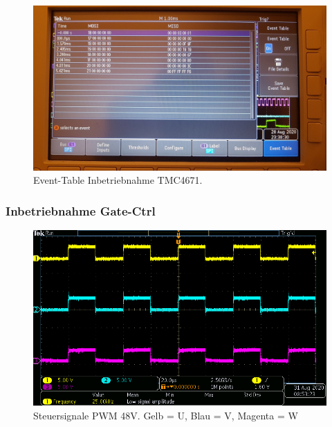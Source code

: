 \begin{appendix}
\begin{figure}[h!]
\center
\includegraphics[width = \textwidth]{graphics/TMC4671_TimeTable_Lesen_Bild}
\caption{Event-Table Inbetriebnahme TMC4671.}
\label{fig:TMC4671_TimeTable_Lesen_Bild}
\end{figure}

\newpage

\subsubsection{Inbetriebnahme Gate-Ctrl}\label{Appendix:TMC4671_Gate_Ctrl}

\begin{figure}[h!]
\center
\includegraphics[width = \textwidth]{graphics/TMC4671_Gate_Signal_H}
\caption{Steuersignale PWM 48V. Gelb = U, Blau = V, Magenta = W}
\label{fig:TMC4671_Gate_Signal_H}
\end{figure}


\end{appendix}
